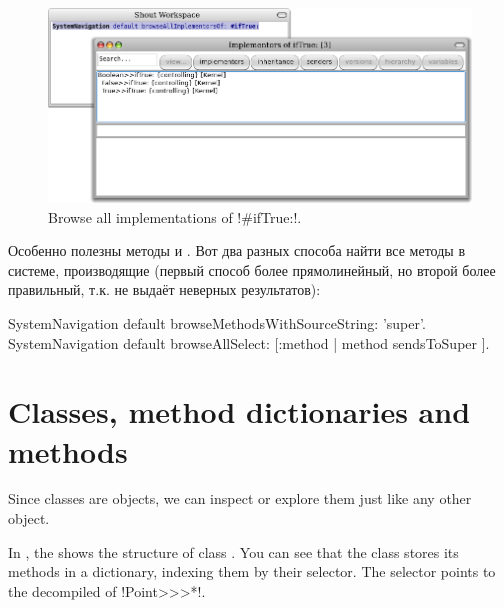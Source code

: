\documentclass[a4paper,10pt,twoside]{book}
\begin{document}
{\begin{figure}[ht]\centering
	\includegraphics[width=\linewidth]{implementors}
	\caption{Browse all implementations of \ct!\#ifTrue:!.}
\end{figure}

Особенно полезны методы  и . Вот два разных способа найти все методы в системе, производящие  (первый способ более прямолинейный, но второй более правильный, т.к. не выдаёт неверных результатов):
\begin{code}{}
SystemNavigation default browseMethodsWithSourceString: 'super'.
SystemNavigation default browseAllSelect: [:method | method sendsToSuper ].
\end{code}

\section{Classes, method dictionaries and methods}

Since classes are objects, we can inspect or explore them just like any other object.


In , the  shows the structure of class .
You can see that the class stores its methods in a dictionary, indexing them by their selector.
The selector \ct{#*} points to the decompiled  of \ct!Point>>>*!.

}
\end{document}

